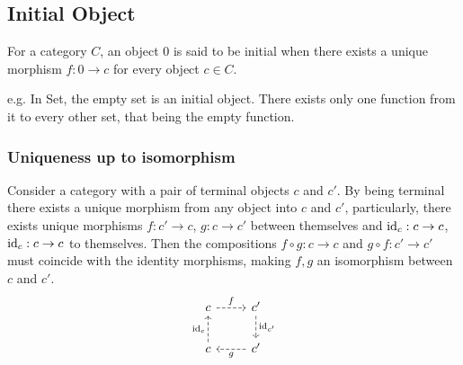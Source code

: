 \subsection{Initial Object}

For a category $C$, an object $0$ is said to be initial when there exists a
unique morphism $f: 0\to c$ for every object $c\in C$.
\parencite{awodey:category_theory}

e.g. In Set, the empty set is an initial object. There exists only one function
from it to every other set, that being the empty function.

\subsubsection*{Uniqueness up to isomorphism}

Consider a category with a pair of terminal objects $c$ and $c'$. By being
terminal there exists a unique morphism from any object into $c$ and $c'$,
particularly, there exists unique morphisms $f: c' \to c$, $g: c \to c'$ between
themselves and $\mathrm{id}_c: c\to c$, $\mathrm{id}_c: c\to c$ to themselves.
Then the compositions $f\circ g:c\to c$ and $g\circ f:c' \to c'$ must coincide
with the identity morphisms, making $f,g$ an isomorphism between $c$ and $c'$.
\[\begin{tikzcd}
	c & {c'} \\
	c & {c'}
	\arrow["{\id_c}", dashed, from=2-1, to=1-1]
	\arrow["f", dashed, from=1-1, to=1-2]
	\arrow["{\id_{c'}}", dashed, from=1-2, to=2-2]
	\arrow["g", dashed, from=2-2, to=2-1]
\end{tikzcd}\]